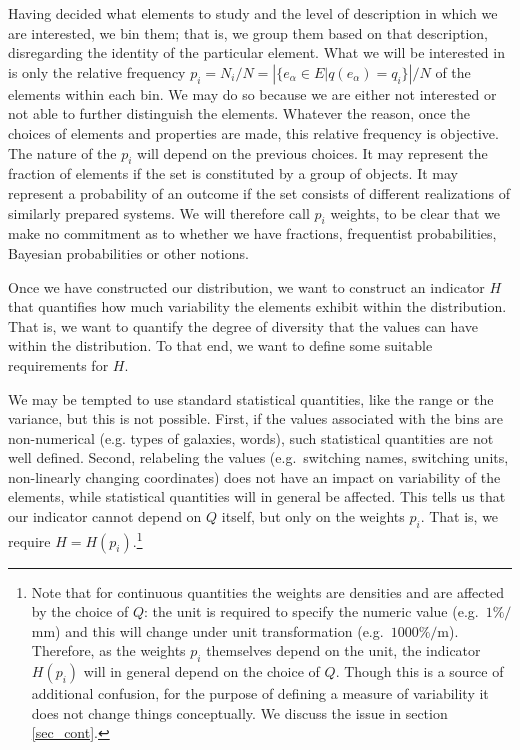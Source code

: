 \documentclass[prb, twocolumn]{revtex4-1}
\begin{document}
Having decided what elements to study and the level of description in which we are interested, we bin them; that is, we group them based on that description, disregarding the identity of the particular element. What we will be interested in is only the relative frequency $p_i = N_i / N = \left| \{e_\alpha \in E | q(e_\alpha) = q_i \} \right| / N$ of the elements within each bin. We may do so because we are either not interested or not able to further distinguish the elements. Whatever the reason, once the choices of elements and properties are made, this relative frequency is objective. The nature of the $p_i$ will depend on the previous choices. It may represent the fraction of elements if the set is constituted by a group of objects. It may represent a probability of an outcome if the set consists of different realizations of similarly prepared systems. We will therefore call $p_i$ weights, to be clear that we make no commitment as to whether we have fractions, frequentist probabilities, Bayesian probabilities or other notions.

Once we have constructed our distribution, we want to construct an indicator $H$ that quantifies how much variability the elements exhibit within the distribution. That is, we want to quantify the degree of diversity that the values can have within the distribution. To that end, we want to define some suitable requirements for $H$.

We may be tempted to use standard statistical quantities, like the range or the variance, but this is not possible. First, if the values associated with the bins are non-numerical (e.g. types of galaxies, words), such statistical quantities are not well defined. Second, relabeling the values (e.g.~switching names, switching units, non-linearly changing coordinates) does not have an impact on variability of the elements, while statistical quantities will in general be affected. This tells us that our indicator cannot depend on $Q$ itself, but only on the weights $p_i$. That is, we require $H=H(p_i)$.\footnote{Note that for continuous quantities the weights are densities and are affected by the choice of $Q$: the unit is required to specify the numeric value (e.g.~$1 \% / $mm) and this will change under unit transformation (e.g.~$1000 \% /$m). Therefore, as the weights $p_i$ themselves depend on the unit, the indicator $H(p_i)$ will in general depend on the choice of $Q$. Though this is a source of additional confusion, for the purpose of defining a measure of variability it does not change things conceptually. We discuss the issue in section \ref{sec_cont}.}
\end{document}
